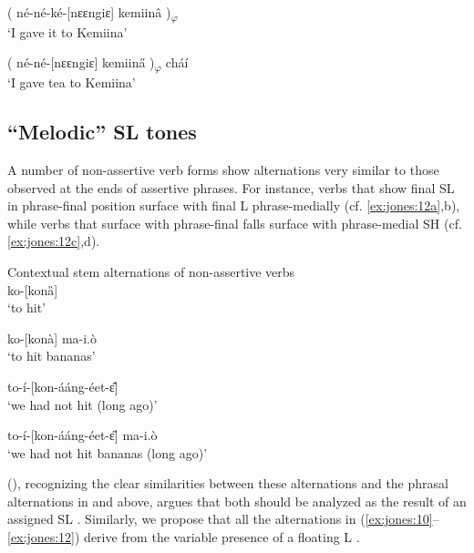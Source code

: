 \documentclass[output=paper,newtxmath,modfonts,nonflat,draft]{langsci/langscibook}
\begin{document}
\ex\label{ex:jones:11b}
{( né-né-ké-[nɛɛngiɛ] kemiinâ )\textsubscript{$\varphi $}}\\
\glt ‘I gave it to Kemiina’    

\ex\label{ex:jones:11c}
{( né-né-[nɛɛngiɛ] kemiin\H{a} )\textsubscript{$\varphi $} cháí}\\
\glt ‘I gave tea to Kemiina’  
\z
\z

\subsection{“Melodic” SL tones}\label{sec:jones:4.3}

A number of non-assertive verb forms show alternations very similar to those observed at the ends of assertive phrases. For instance, verbs that show final SL in phrase-final position surface with final L phrase-medially (cf. \ref{ex:jones:12a},b), while verbs that surface with phrase-final falls surface with phrase-medial SH (cf. \ref{ex:jones:12c},d).

\ea\label{ex:jones:12}
{Contextual stem alternations of non-assertive verbs} \\
\ea\label{ex:jones:12a}
{ko-[konȁ]} \\
\glt ‘to hit’

\ex\label{ex:jones:12b}
{ko-[kon\`a] ma-i.\`o}\\
\glt ‘to hit bananas’

\ex\label{ex:jones:12c}
{to-í-[kon-ááng-éet-\^ɛ]}\\
\glt ‘we had not hit (long ago)’

\ex\label{ex:jones:12d}
{to-í-[kon-ááng-éet-\H{ɛ}] ma-i.\`o} \\
\glt ‘we had not hit bananas (long ago)’
\z
\z

\citeauthor{Roberts-Kohno2000} (\citeyear{Roberts-Kohno2000,Roberts-Kohno2014}), recognizing the clear similarities between these alternations and the phrasal alternations in  and  above, argues that both should be analyzed as the result of an assigned SL . Similarly, we propose that all the alternations in (\ref{ex:jones:10}--\ref{ex:jones:12}) derive from the variable presence of a floating L .
\end{document}
